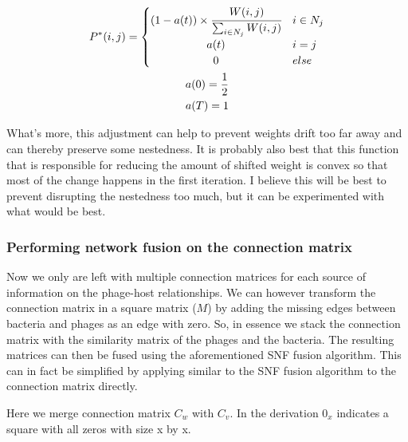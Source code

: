 \documentclass{article}
\begin{document}
\begin{equation}
    \begin{gathered}
    P^*(i, j) = 
    \begin{cases}
        (1 - a(t)) \times \cfrac{W(i, j)}{\sum_{i \in N_j}W(i, j)} & i \in N_j \\
        \hfil a(t) & i = j \\
        \hfil 0 & else
    \end{cases} \\
    a(0) = \frac{1}{2} \\
    a(T) = 1
    \end{gathered}
\end{equation}

What's more, this adjustment can help to prevent weights drift too far away and
can thereby preserve some nestedness. It is probably also best
that this function that is responsible for reducing the amount of shifted weight
is convex so that most of the change happens in the 
first iteration. I believe this will be best to prevent disrupting the 
nestedness too much, but it can be experimented with what would be best.

\subsubsection{Performing network fusion on the connection matrix}

Now we only are left with multiple connection matrices for each source of 
information on the phage-host relationships. We can however transform the
connection matrix in a square matrix ($M$) by adding the missing edges between
bacteria and phages as an edge with zero. So, in essence we stack
the connection matrix with the similarity matrix of the phages and the bacteria.
The resulting matrices can then
be fused using the aforementioned SNF fusion algorithm. This can in fact
be simplified by applying similar to the SNF fusion algorithm to the connection matrix 
directly. 

Here we merge connection matrix $C_w$ with $C_v$. In the derivation $0_x$ indicates a square with all zeros with size x by x.
\end{document}
